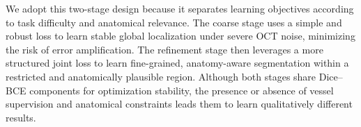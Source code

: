 \documentclass[11pt]{article}
\begin{document}
\begin{enumerate}
{    We adopt this two-stage design because it separates learning objectives according to task difficulty and anatomical relevance.
    The coarse stage uses a simple and robust loss to learn stable global localization under severe OCT noise, minimizing the risk of error amplification.
    The refinement stage then leverages a more structured joint loss to learn fine-grained, anatomy-aware segmentation within a restricted and anatomically plausible region.
    Although both stages share Dice--BCE components for optimization stability, the presence or absence of vessel supervision and anatomical constraints leads them to learn qualitatively different results.
    }
	\end{enumerate}

\nocite{*}


\end{document}
